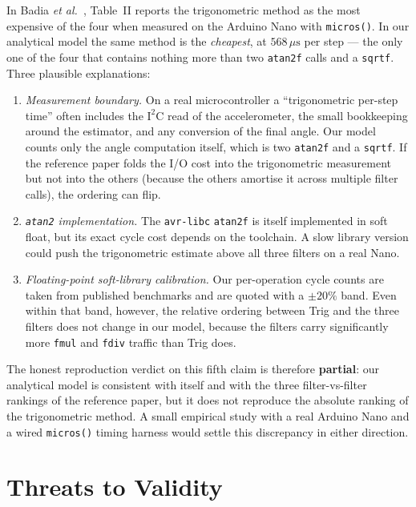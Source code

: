 \documentclass[conference]{IEEEtran}
\begin{document}
In Badia \textit{et al.}~\cite{badia2023}, Table~II reports the
trigonometric method as the most expensive of the four when
measured on the Arduino Nano with \texttt{micros()}. In our
analytical model the same method is the \emph{cheapest}, at
$568\,\mu\mathrm{s}$ per step --- the only one of the four that
contains nothing more than two \texttt{atan2f} calls and a
\texttt{sqrtf}. Three plausible explanations:
\begin{enumerate}
\item \textit{Measurement boundary.} On a real microcontroller a
``trigonometric per-step time'' often includes the $\mathrm{I}^2\mathrm{C}$
read of the accelerometer, the small bookkeeping around the
estimator, and any conversion of the final angle. Our model
counts only the angle computation itself, which is two
\texttt{atan2f} and a \texttt{sqrtf}. If the reference paper
folds the I/O cost into the trigonometric measurement but not
into the others (because the others amortise it across multiple
filter calls), the ordering can flip.
\item \textit{\texttt{atan2} implementation.} The
\texttt{avr-libc} \texttt{atan2f} is itself implemented in soft
float, but its exact cycle cost depends on the toolchain. A
slow library version could push the trigonometric estimate
above all three filters on a real Nano.
\item \textit{Floating-point soft-library calibration.} Our
per-operation cycle counts are taken from published benchmarks
and are quoted with a $\pm 20\%$ band. Even within that band,
however, the relative ordering between Trig and the three
filters does not change in our model, because the filters carry
significantly more \texttt{fmul} and \texttt{fdiv} traffic than
Trig does.
\end{enumerate}
The honest reproduction verdict on this fifth claim is therefore
\textbf{partial}: our analytical model is consistent with itself
and with the three filter-vs-filter rankings of the reference
paper, but it does not reproduce the absolute ranking of the
trigonometric method. A small empirical study with a real Arduino
Nano and a wired \texttt{micros()} timing harness would settle
this discrepancy in either direction.

\section{Threats to Validity}\label{sec:threats}
\end{document}
